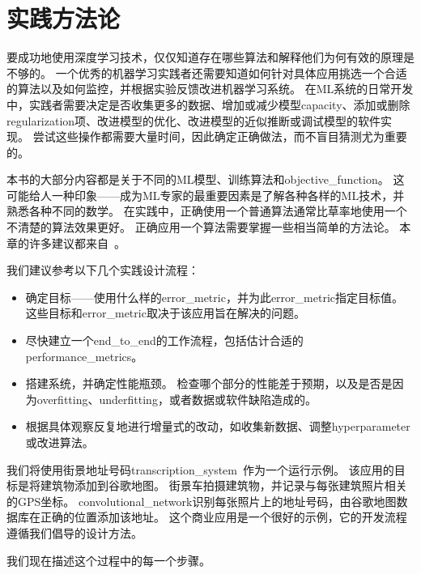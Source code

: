 \chapter{实践方法论}
\label{chap:practical_methodology}
要成功地使用深度学习技术，仅仅知道存在哪些算法和解释他们为何有效的原理是不够的。
一个优秀的机器学习实践者还需要知道如何针对具体应用挑选一个合适的算法以及如何监控，并根据实验反馈改进机器学习系统。
在\gls{ML}系统的日常开发中，实践者需要决定是否收集更多的数据、增加或减少模型\gls{capacity}、添加或删除\gls{regularization}项、改进模型的优化、改进模型的近似推断或调试模型的软件实现。
尝试这些操作都需要大量时间，因此确定正确做法，而不盲目猜测尤为重要的。


本书的大部分内容都是关于不同的\gls{ML}模型、训练算法和\gls{objective_function}。
这可能给人一种印象——成为\gls{ML}专家的最重要因素是了解各种各样的\gls{ML}技术，并熟悉各种不同的数学。
在实践中，正确使用一个普通算法通常比草率地使用一个不清楚的算法效果更好。
正确应用一个算法需要掌握一些相当简单的方法论。
本章的许多建议都来自~\cite{ng-lecture-advice}。


我们建议参考以下几个实践设计流程：
\begin{itemize}
\item 确定目标——使用什么样的\gls{error_metric}，并为此\gls{error_metric}指定目标值。
这些目标和\gls{error_metric}取决于该应用旨在解决的问题。


\item 尽快建立一个\gls{end_to_end}的工作流程，包括估计合适的\gls{performance_metrics}。

\item 搭建系统，并确定性能瓶颈。
检查哪个部分的性能差于预期，以及是否是因为\gls{overfitting}、\gls{underfitting}，或者数据或软件缺陷造成的。

\item 根据具体观察反复地进行增量式的改动，如收集新数据、调整\gls{hyperparameter}或改进算法。
\end{itemize}


我们将使用街景地址号码\gls{transcription_system}~\citep{Goodfellow+et+al-ICLR2014a}作为一个运行示例。
该应用的目标是将建筑物添加到谷歌地图。
街景车拍摄建筑物，并记录与每张建筑照片相关的GPS坐标。
\gls{convolutional_network}识别每张照片上的地址号码，由谷歌地图数据库在正确的位置添加该地址。
这个商业应用是一个很好的示例，它的开发流程遵循我们倡导的设计方法。

我们现在描述这个过程中的每一个步骤。



